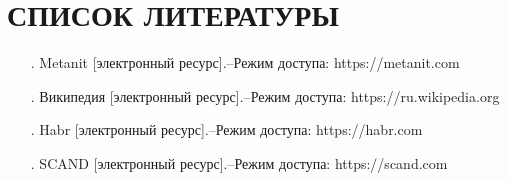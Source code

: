 \sectionbreak \section*{ 
	\gostTitleFont
	\redline
	СПИСОК ЛИТЕРАТУРЫ
}
\titlespace

{\gostFont
	
	\begin{itemize}[leftmargin=2.15cm, labelwidth=0.65cm, labelsep=0.0cm] 
		
		\item[\theimagecntr.] Metanit [электронный ресурс].{--}Режим доступа: https://metanit.com
		\addtocounter{imagecntr}{1}
		
		\item[\theimagecntr.] Википедия [электронный ресурс].{--}Режим доступа: https://ru.wikipedia.org
		\addtocounter{imagecntr}{1}
		
		\item[\theimagecntr.] Habr [электронный ресурс].{--}Режим доступа: https://habr.com
		\addtocounter{imagecntr}{1}
		
		\item[\theimagecntr.] SCAND [электронный ресурс].{--}Режим доступа: https://scand.com
		\addtocounter{imagecntr}{1}
		
		
	\end{itemize}
	
}

